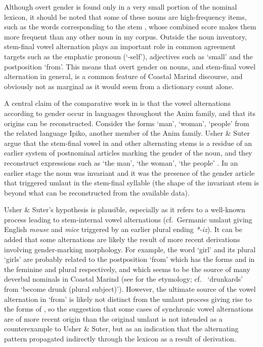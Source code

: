 \documentclass[output=collectionpaper]{langsci/langscibook}
\begin{document}
Although overt gender is found only in a very small portion of the nominal lexicon, it should be noted that some of these nouns are high-frequency items, such as the words corresponding to the stem , whose combined score makes them more frequent than any other noun in my corpus. Outside the noun inventory, stem-final vowel alternation plays an important role in common agreement targets such as the emphatic pronoun  (`-self'), adjectives such as  `small' and the postposition  `from'. This means that overt gender on nouns, and stem-final vowel alternation in general, is a common feature of Coastal Marind discourse, and obviously not as marginal as it would seem from a dictionary count alone.

A central claim of the comparative work in \textcite{Usher2015} is that the vowel alternations according to gender occur in languages throughout the Anim family, and that its origins can be reconstructed. Consider the forms  `man',  `woman',  `people' from the related language Ipiko, another member of the Anim family. Usher \& Suter argue that the stem-final vowel in  and other alternating stems is a residue of an earlier system of postnominal articles marking the gender of the noun, and they reconstruct expressions such as  `the man',  `the woman',  `the people' \parencite*[114]{Usher2015}. In an earlier stage the noun was invariant and it was the presence of the gender article that triggered umlaut in the stem-final syllable (the shape of the invariant stem is beyond what can be reconstructed from the available data).

Usher \& Suter's hypothesis is plausible, especially as it refers to a well-known process leading to stem-internal vowel alternations (cf.\ Germanic umlaut giving English \emph{mouse} and \emph{mice} triggered by an earlier plural ending \emph{*-iz}). It can be added that some alternations are likely the result of more recent derivations involving gender-marking morphology. For example, the word  `girl' and its plural  `girls' are probably related to the postposition `from' which has the forms  and  in the feminine and plural respectively, and which seems to be the source of many deverbal nominals in Coastal Marind (see \citealt[335]{Geurtjens1933} for the etymology; cf.\  `drunkards' from  `become drunk (plural subject)'). However, the ultimate source of the vowel alternation in  `from' is likely not distinct from the umlaut process giving rise to the forms of , so the suggestion that some cases of synchronic vowel alternations are of more recent origin than the original umlaut is not intended as a counterexample to Usher \& Suter, but as an indication that the alternating pattern propagated indirectly through the lexicon as a result of derivation.
\end{document}
